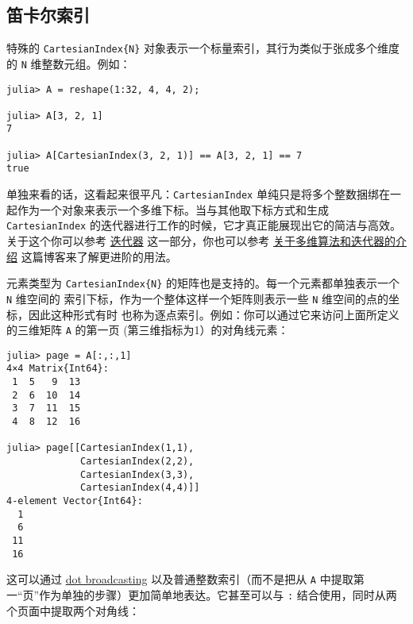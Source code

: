 \hypertarget{6884198732360978942}{}


\subsection{笛卡尔索引}



特殊的 \texttt{CartesianIndex\{N\}} 对象表示一个标量索引，其行为类似于张成多个维度的 \texttt{N} 维整数元组。例如：




\begin{verbatim}
julia> A = reshape(1:32, 4, 4, 2);

julia> A[3, 2, 1]
7

julia> A[CartesianIndex(3, 2, 1)] == A[3, 2, 1] == 7
true
\end{verbatim}



单独来看的话，这看起来很平凡：\texttt{CartesianIndex} 单纯只是将多个整数捆绑在一起作为一个对象来表示一个多维下标。当与其他取下标方式和生成 \texttt{CartesianIndex} 的迭代器进行工作的时候，它才真正能展现出它的简洁与高效。关于这个你可以参考 \hyperlink{9973578417281662233}{迭代器} 这一部分，你也可以参考 \href{https://julialang.org/blog/2016/02/iteration}{关于多维算法和迭代器的介绍} 这篇博客来了解更进阶的用法。



元素类型为 \texttt{CartesianIndex\{N\}}  的矩阵也是支持的。每一个元素都单独表示一个 \texttt{N} 维空间的 索引下标，作为一个整体这样一个矩阵则表示一些 \texttt{N} 维空间的点的坐标，因此这种形式有时 也称为逐点索引。例如：你可以通过它来访问上面所定义的三维矩阵  \texttt{A} 的第一页 (第三维指标为1）的对角线元素：




\begin{verbatim}
julia> page = A[:,:,1]
4×4 Matrix{Int64}:
 1  5   9  13
 2  6  10  14
 3  7  11  15
 4  8  12  16

julia> page[[CartesianIndex(1,1),
             CartesianIndex(2,2),
             CartesianIndex(3,3),
             CartesianIndex(4,4)]]
4-element Vector{Int64}:
  1
  6
 11
 16
\end{verbatim}



这可以通过 \hyperlink{17801130558550430478}{dot broadcasting} 以及普通整数索引（而不是把从 \texttt{A} 中提取第一“页”作为单独的步骤）更加简单地表达。它甚至可以与 \texttt{:} 结合使用，同时从两个页面中提取两个对角线：




